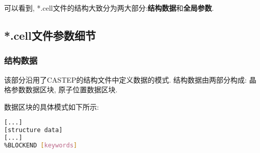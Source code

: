 \documentclass[a4paper, 10pt]{article}
\begin{document}
可以看到, *.cell文件的结构大致分为两大部分:\textbf{结构数据}和\textbf{全局参数}.

\subsection{*.cell文件参数细节}
\subsubsection{结构数据}
该部分沿用了CASTEP的结构文件中定义数据的模式. 结构数据由两部分构成: 晶格参数数据区块, 原子位置数据区块. 

数据区块的具体模式如下所示:
\begin{lstlisting}[language={bash}]
%BLOCK [keywords]
[...]
[structure data]
[...]
%BLOCKEND [keywords]
\end{lstlisting}
\end{document}
